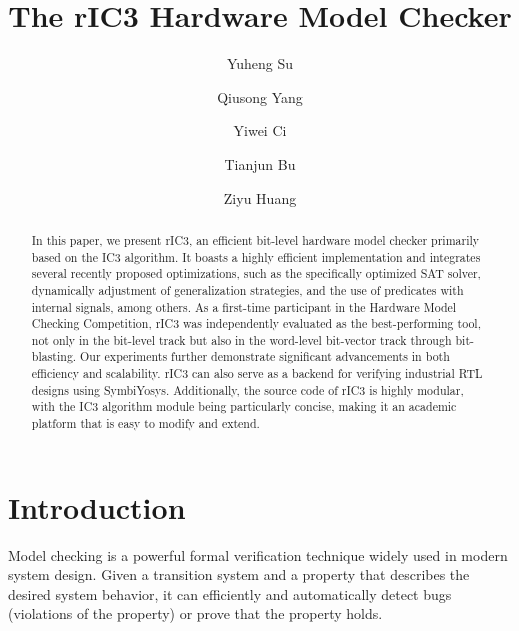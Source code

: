 \documentclass[runningheads]{llncs}
\begin{document}
\title{The rIC3 Hardware Model Checker}

\author{
    Yuheng Su \and
    Qiusong Yang \and
    Yiwei Ci \and
    Tianjun Bu\and
    Ziyu Huang}

\maketitle

\begin{abstract} In this paper, we present rIC3, an efficient bit-level hardware model checker primarily based on the IC3 algorithm. It boasts a highly efficient implementation and integrates several recently proposed optimizations, such as the specifically optimized SAT solver, dynamically adjustment of generalization strategies, and the use of predicates with internal signals, among others. As a first-time participant in the Hardware Model Checking Competition, rIC3 was independently evaluated as the best-performing tool, not only in the bit-level track but also in the word-level bit-vector track through bit-blasting. Our experiments further demonstrate significant advancements in both efficiency and scalability. rIC3 can also serve as a backend for verifying industrial RTL designs using SymbiYosys. Additionally, the source code of rIC3 is highly modular, with the IC3 algorithm module being particularly concise, making it an academic platform that is easy to modify and extend.

\end{abstract}

\section{Introduction}
Model checking \cite{ModelChecking,HandbookMC} is a powerful formal verification technique widely used in modern system design. Given a transition system and a property that describes the desired system behavior, it can efficiently and automatically detect bugs (violations of the property) or prove that the property holds.
\end{document}
